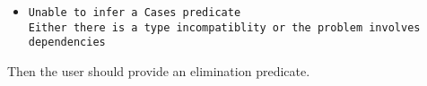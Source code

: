 \begin{itemize}
  \begin{itemize}
  \item {\tt Unable to infer a Cases predicate\\
    Either there is a type incompatiblity or the problem involves\\
    dependencies}
  \end{itemize}

  Then the user should provide an elimination predicate.








\end{itemize}
